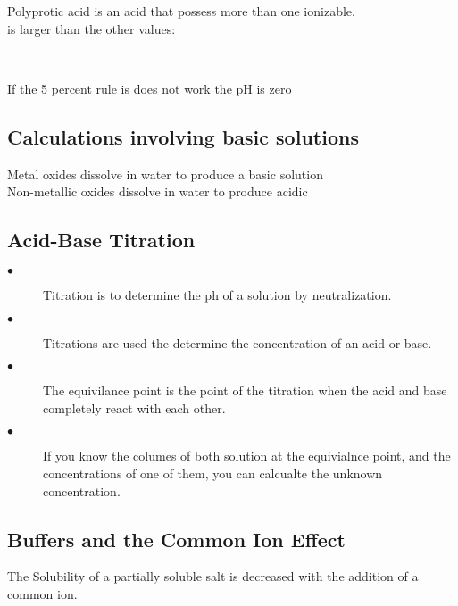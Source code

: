 \documentclass{article}
\begin{document}
\noindent
Polyprotic acid is an acid that possess more than one ionizable.\\

\noindent
{} is larger than the other  values:
\begin{center}
\\
\end{center}

\noindent
If the 5 percent rule is does not work the pH is zero\\

\subsection{Calculations involving basic solutions}

\begin{center}
\end{center}

\noindent
Metal oxides dissolve in water to produce a basic solution\\

\noindent
Non-metallic oxides dissolve in water to produce acidic 

\subsection{Acid-Base Titration}
\vspace{2mm}
 \begin{description}
 \item[$\bullet$]\noindent Titration is to determine the ph of a solution by neutralization.

\item[$\bullet$]\noindent Titrations are used the determine the concentration of an acid or base.

\item[$\bullet$]\noindent  The equivilance point is the point of the titration when the acid and base completely react with each other.

\item[$\bullet$]\noindent If you know the columes of both solution at the equivialnce point, and the concentrations of one of them, you can calcualte the unknown concentration.
 \end{description}
 \subsection{Buffers and the Common Ion Effect}
 \vspace{2mm}
 The Solubility of a partially soluble salt is decreased with the addition of a common ion.\\
\end{document}
